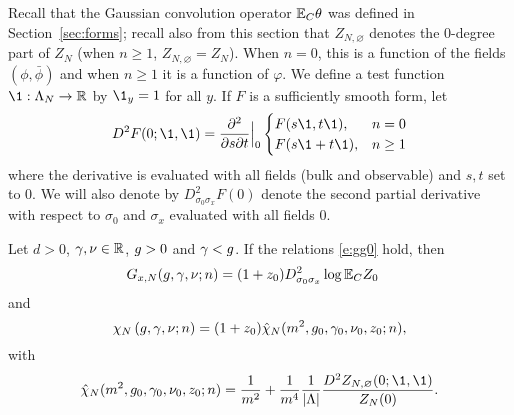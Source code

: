 Recall that the Gaussian convolution operator $\mathbb{E}_C\theta$ was defined in
Section~\ref{sec:forms}; recall also from this section that $Z_{N,\varnothing}$
denotes the $0$-degree part of $Z_N$ (when $n \ge 1$, $Z_{N,\varnothing} = Z_N$).
When $n = 0$, this is a function of the fields $(\phi, \bar\phi)$ and when $n \ge 1$
it is a function of $\varphi$. We define a test function $\1: \Lambda_N \to \R$ by
$\1_y=1$ for all $y$. If $F$ is a sufficiently smooth form, let
\begin{equation}
D^2 F(0; \1, \1)
  =
\ddp{^2}{s\partial t}\Big|_0
\begin{cases}
F(s \1, t\1), & n = 0 \\
F(s \1 + t\1), & n \ge 1
\end{cases}
\end{equation}
where the derivative is evaluated with all fields (bulk and observable) and $s, t$ set to $0$.
We will also denote by $D^2_{\sigma_0\sigma_x} F(0)$ denote the second partial derivative
with respect to $\sigma_0$ and $\sigma_x$ evaluated with all fields $0$.

\begin{prop}
\label{prop:intrep}
Let $d > 0$, $\gamma, \nu \in {\mathbb R}$, $g >0$ and $\gamma <g$.
If the relations \eqref{e:gg0} hold, then
\begin{align}
\label{e:generating-fn}
G_{x,N}(g, \gamma, \nu; n)
	&=
(1+z_0)
D^2_{\sigma_0\sigma_x}
\log \mathbb{E}_C Z_0
\end{align}
and
\begin{equation}
\label{e:chichibar}
\chi_N\left(g,\gamma,\nu; n\right)
	=
(1+z_0)\hat\chi_N(m^2, g_0, \gamma_0, \nu_0, z_0; n),
\end{equation}
with
\begin{equation}
\label{e:chibarm}
\hat\chi_N(m^2, g_0, \gamma_0, \nu_0, z_0; n)
	=
\frac{1}{m^2}
	+
\frac{1}{m^4} \frac{1}{|\Lambda|} \frac{D^2 Z_{N,\varnothing}(0; \1, \1)}{Z_N(0)}.
\end{equation}
\end{prop}

